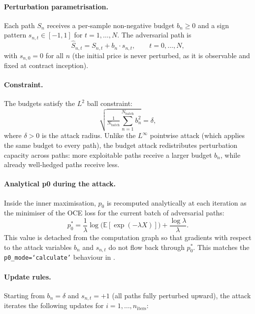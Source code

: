 \paragraph{Perturbation parametrisation.}
Each path $S_n$ receives a per-sample non-negative budget $b_n \geq 0$ and a
sign pattern $s_{n,t} \in [-1, 1]$ for $t = 1, \ldots, N$.  The adversarial
path is
\begin{equation}
  \hat{S}_{n,t} = S_{n,t} + b_n \cdot s_{n,t},
  \qquad t = 0, \ldots, N,
  \label{eq:budget_att}
\end{equation}
with $s_{n,0} = 0$ for all $n$ (the initial price is never perturbed, as it is
observable and fixed at contract inception).

\paragraph{Constraint.}
The budgets satisfy the $L^2$ ball constraint:
\begin{equation}
  \sqrt{\tfrac{1}{N_{\mathrm{batch}}}\textstyle\sum_{n=1}^{N_{\mathrm{batch}}} b_n^2}
  = \delta,
  \label{eq:budget_constraint}
\end{equation}
where $\delta > 0$ is the attack radius.  Unlike the $L^\infty$ pointwise
attack (which applies the same budget to every path), the budget attack
redistributes perturbation capacity across paths: more exploitable paths
receive a larger budget $b_n$, while already well-hedged paths receive
less.

\paragraph{Analytical p0 during the attack.}
Inside the inner maximisation, $p_0$ is recomputed analytically at each
iteration as the minimiser of the OCE loss for the current batch of adversarial
paths:
\begin{equation}
  p_0^* = \frac{1}{\lambda}\log\!\bigl(\mathbb{E}[\exp(-\lambda X)]\bigr)
          + \frac{\log\lambda}{\lambda}.
  \label{eq:p0_calc}
\end{equation}
This value is detached from the computation graph so that gradients with
respect to the attack variables $b_n$ and $s_{n,t}$ do not flow back through
$p_0^*$.  This matches the \texttt{p0\_mode=`calculate'} behaviour in
\citet{he2025}.

\paragraph{Update rules.}
Starting from $b_n = \delta$ and $s_{n,t} = +1$ (all paths fully perturbed
upward), the attack iterates the following updates for $i = 1, \ldots,
n_{\mathrm{iters}}$:

